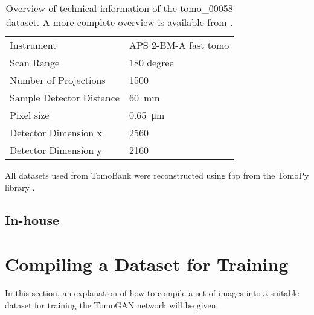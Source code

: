 
\begin{table}[htbp]
    \centering
    \caption[Dataset information tomo\_00058]{Overview of technical information of the tomo\_00058 dataset. A more complete overview is available from \cite{datasetglassspheres}. }
    \label{tab:tomo00058}
    \begin{tabular}{ll}
    \hline
    Instrument & APS 2-BM-A fast tomo \\
    Scan Range & 180 degree \\
    Number of Projections & 1500 \\
    Sample Detector Distance & \SI{60}{\milli \meter} \\
    Pixel size & \SI{0.65}{\micro \meter} \\
    Detector Dimension x & 2560 \\
    Detector Dimension y & 2160 \\
    \hline
    \end{tabular}
\end{table}

All datasets used from TomoBank were reconstructed using \acrshort{fbp} from the TomoPy library \cite{tomopy}. 


\subsection{In-house}

\section{Compiling a Dataset for Training}
\label{sec:method:compilingdataset}
In this section, an explanation of how to compile a set of images into a suitable dataset for training the TomoGAN network will be given. %

